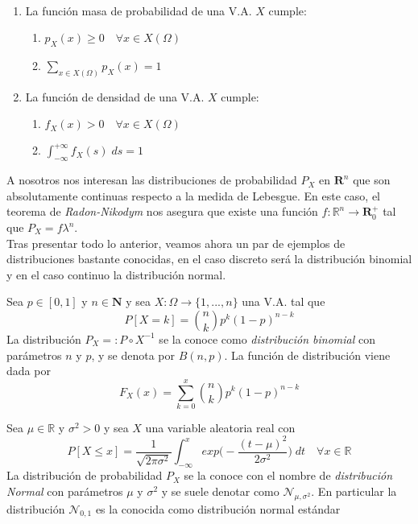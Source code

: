     \begin{proposicion}[Propiedades f.d. y f.m.p.]~\smallskip
    \begin{enumerate}
        \item La función masa de probabilidad de una V.A. $X$ cumple:
        \begin{enumerate}
            \item $p_X(x) \geq 0 \quad \forall x \in X(\Omega)$
            \item $\sum_{x\in X(\Omega)}p_X (x) = 1$
        \end{enumerate}
        \item La función de densidad de una V.A. $X$ cumple:
        \begin{enumerate}
            \item $f_X(x) > 0 \quad \forall x \in X(\Omega)$
            \item $\int_{-\infty}^{+\infty} f_X(s) \; ds = 1$
        \end{enumerate}
    \end{enumerate}
    
    \end{proposicion}
    
    A nosotros nos interesan las distribuciones de probabilidad $P_X$ en $\mathbf{R}^n$ que son absolutamente continuas respecto a la medida de Lebesgue. En este caso, el teorema de \textit{Radon-Nikodym} \cite{probcourse} nos asegura que existe una función $f:\mathbb{R}^n \to \mathbf{R}_0^+$ tal que $P_X = f \lambda^n$. \\
    
    
    Tras presentar todo lo anterior, veamos ahora un par de ejemplos de distribuciones bastante conocidas, en el caso discreto será la distribución binomial y en el caso continuo la distribución normal.
    
    \begin{ejemplo}
    Sea $p \in [0,1]$ y $n \in \mathbf{N}$ y sea $X:\Omega \to \{1,...,n\}$ una V.A. tal que 
    $$P[X=k] = \binom{n}{k} p^k (1-p)^{n-k}$$
    La distribución $P_X =: P \circ X^{-1}$ se la conoce como \textit{distribución binomial} con parámetros $n$ y $p$, y se denota por $B(n,p)$. La función de distribución viene dada por 
    $$F_X(x) = \sum_{k=0}^x  \binom{n}{k} p^k (1-p)^{n-k}$$
    \end{ejemplo}


    \begin{ejemplo}
     Sea $\mu \in \mathbb{R}$ y $\sigma^2 > 0$ y sea $X$ una variable aleatoria real con 
     $$P[X \leq x] = \frac{1}{\sqrt{2 \pi \sigma^2}} \int_{-\infty}^x exp \Big(-\frac{(t - \mu)^2}{2 \sigma^2}\Big) \; dt \quad \forall x \in \mathbb{R}$$
     La distribución de probabilidad $P_X$ se la conoce con el nombre de \textit{distribución Normal} con parámetros $\mu$ y $\sigma^2$ y se suele denotar como $\mathcal{N}_{\mu,\sigma^2}$. En particular la distribución $\mathcal{N}_{0,1}$ es la conocida como distribución normal estándar
    \end{ejemplo}
     

